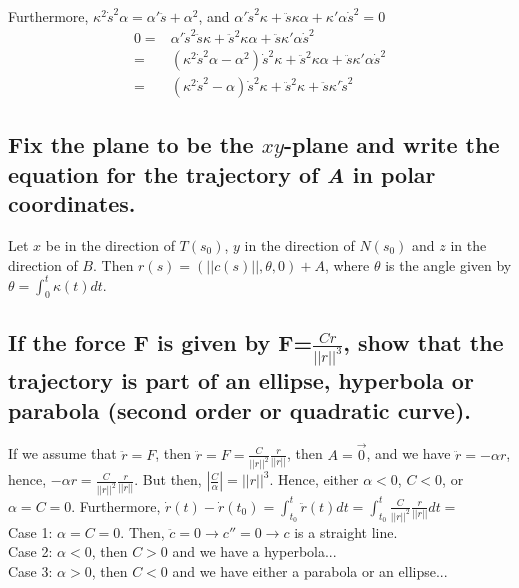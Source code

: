 \documentclass[12pt]{amsart}
\begin{document}
\\Furthermore, $\kappa^2\dot s^2\alpha=\alpha'\ddot s+\alpha^2$, and $\alpha'\dot s^2\kappa+\ddot s\kappa\alpha+\kappa'\alpha\dot s^2=0$
\begin{align*}
	0=&\alpha'\dot s^2\ddot s\kappa+\ddot s^2\kappa\alpha+\ddot s\kappa'\alpha\dot s^2
	\\=&(\kappa^2\dot s^2\alpha-\alpha^2)\dot s^2\kappa+\ddot s^2\kappa\alpha+\ddot s\kappa'\alpha\dot s^2
	\\=&(\kappa^2\dot s^2-\alpha)\dot s^2\kappa+\ddot s^2\kappa+\ddot s\kappa'\dot s^2
\end{align*}

\subsection{Fix the plane to be the $xy$-plane and write the equation for the trajectory of \emph{A} in polar coordinates.}
Let $x$ be in the direction of $T(s_0)$, $y$ in the direction of $N(s_0)$ and $z$ in the direction of $B$. Then $r(s)=(||c(s)||,\theta,0)+A$, where $\theta$ is the angle given by $\theta=\int_0^t\kappa(t)dt$.

\subsection{If the force \textbf{F} is given by \textbf{F}=$\frac{Cr}{||r||^3}$, show that the trajectory is part of an ellipse, hyperbola or parabola (second order or quadratic curve).}
If we assume that $\ddot r=F$, then $\ddot r=F=\frac{C}{||r||^2}\frac{r}{||r||}$, then $A=\vec0$, and we have $\ddot r=-\alpha r$, hence, $-\alpha r=\frac{C}{||r||^2}\frac{r}{||r||}$. But then, $\left|\frac{C}{\alpha}\right|=||r||^3$. Hence, either $\alpha<0$, $C<0$, or $\alpha=C=0$. Furthermore, $\dot r(t)-\dot r(t_0)=\int_{t_0}^t\ddot r(t)dt=\int_{t_0}^t\frac{C}{||r||^2}\frac{r}{||r||}dt=$
\\Case 1: $\alpha=C=0$. Then, $\ddot c=0\rightarrow c''=0\rightarrow c$ is a straight line.
\\Case 2: $\alpha<0$, then $C>0$ and we have a hyperbola...
\\Case 3: $\alpha>0$, then $C<0$ and we have either a parabola or an ellipse...

\setcounter{equation}{0}
\newpage%
\end{document}
